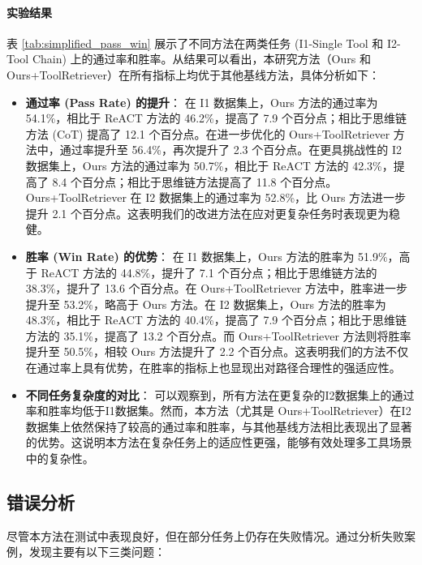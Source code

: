 \paragraph{实验结果}

表 \ref{tab:simplified_pass_win} 展示了不同方法在两类任务 (I1-Single Tool 和 I2-Tool Chain) 上的通过率和胜率。从结果可以看出，本研究方法（Ours 和 Ours+ToolRetriever）在所有指标上均优于其他基线方法，具体分析如下：

\begin{itemize}
    \item \textbf{通过率 (Pass Rate) 的提升}：
    在 I1 数据集上，Ours 方法的通过率为 54.1\%，相比于 ReACT 方法的 46.2\%，提高了 7.9 个百分点；相比于思维链方法 (CoT) 提高了 12.1 个百分点。在进一步优化的 Ours+ToolRetriever 方法中，通过率提升至 56.4\%，再次提升了 2.3 个百分点。在更具挑战性的 I2 数据集上，Ours 方法的通过率为 50.7\%，相比于 ReACT 方法的 42.3\%，提高了 8.4 个百分点；相比于思维链方法提高了 11.8 个百分点。Ours+ToolRetriever 在 I2 数据集上的通过率为 52.8\%，比 Ours 方法进一步提升 2.1 个百分点。这表明我们的改进方法在应对更复杂任务时表现更为稳健。

    \item \textbf{胜率 (Win Rate) 的优势}：
    在 I1 数据集上，Ours 方法的胜率为 51.9\%，高于 ReACT 方法的 44.8\%，提升了 7.1 个百分点；相比于思维链方法的 38.3\%，提升了 13.6 个百分点。在 Ours+ToolRetriever 方法中，胜率进一步提升至 53.2\%，略高于 Ours 方法。在 I2 数据集上，Ours 方法的胜率为 48.3\%，相比于 ReACT 方法的 40.4\%，提高了 7.9 个百分点；相比于思维链方法的 35.1\%，提高了 13.2 个百分点。而 Ours+ToolRetriever 方法则将胜率提升至 50.5\%，相较 Ours 方法提升了 2.2 个百分点。这表明我们的方法不仅在通过率上具有优势，在胜率的指标上也显现出对路径合理性的强适应性。

    \item \textbf{不同任务复杂度的对比}：
    可以观察到，所有方法在更复杂的I2数据集上的通过率和胜率均低于I1数据集。然而，本方法（尤其是 Ours+ToolRetriever）在I2数据集上依然保持了较高的通过率和胜率，与其他基线方法相比表现出了显著的优势。这说明本方法在复杂任务上的适应性更强，能够有效处理多工具场景中的复杂性。
\end{itemize}

\subsection{错误分析}
\label{subsec:error_analysis}

尽管本方法在测试中表现良好，但在部分任务上仍存在失败情况。通过分析失败案例，发现主要有以下三类问题：

